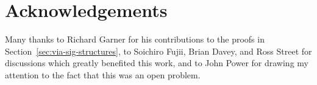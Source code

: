 \documentclass[11pt, a4paper, twoside,leqno]{amsart}
\numberwithin{equation}{section}
\theoremstyle{plain}
\theoremstyle{definition}
\begin{document}
\section*{Acknowledgements}
Many thanks to Richard Garner for his contributions to the proofs in Section~\ref{sec:via-sig-structures}, to Soichiro Fujii, Brian Davey,
and Ross Street for discussions which greatly benefited this work, and
to John Power for drawing my attention to the fact that this was an open problem.



 
\end{document}
